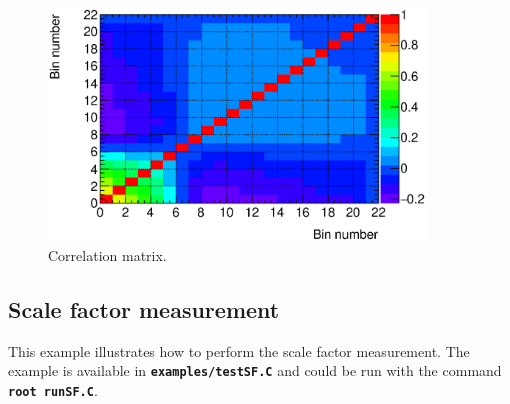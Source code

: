 \documentclass[12pt]{article}
\newcommand\verbbfb[1]{\textcolor[rgb]{0,0,0}{\texttt{\textbf{#1}}}}
\begin{document}
\begin{figure}[hbtp]
\begin{center}
\includegraphics[width=10cm]{pics/matrix.eps}
\caption{Correlation matrix.}
\label{fig:matrix}
\end{center}
\end{figure}

\FloatBarrier

\subsection{Scale factor measurement}
\label{sec:exampleSF}

This example illustrates how to perform the scale factor measurement. The example is available in
\verbbfb{examples/testSF.C} and could be run with the command
\verbbfb{root runSF.C}.
\end{document}
